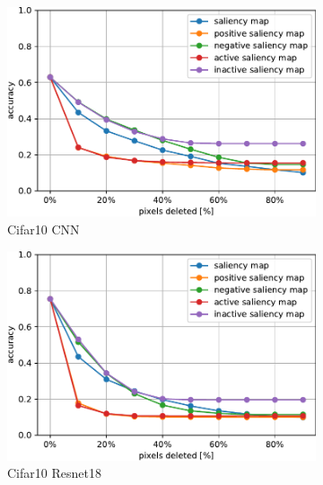 \documentclass[preprint,12pt]{elsarticle}
\begin{document}
\begin{figure}
    \centering
    \begin{subfigure}{0.49\linewidth}
        \centering
        \includegraphics[width=\linewidth]{../visualizations/benchmarks/black_deletion/cifar10_cnn.pdf}
        \caption{Cifar10 CNN}
    \end{subfigure}
    \hfill
    \begin{subfigure}{0.49\linewidth}
        \centering
        \includegraphics[width=\linewidth]{../visualizations/benchmarks/black_deletion/cifar10_resnet18.pdf}
        \caption{Cifar10 Resnet18}
    \end{subfigure}\\
    \hfill
    \begin{subfigure}{0.49\textwidth}
        \centering

\end{subfigure}
\end{figure}
\end{document}
